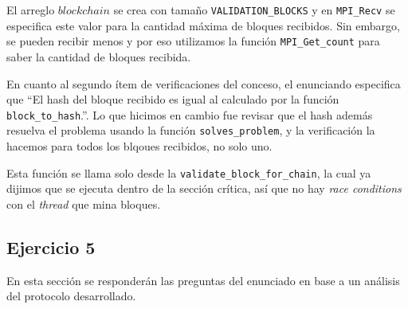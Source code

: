 \documentclass[10pt, a4paper, hidelinks]{article}
\begin{document}
El arreglo $blockchain$ se crea con tamaño \texttt{VALIDATION\_BLOCKS} y en \texttt{MPI\_Recv} se especifica este valor para la cantidad máxima de bloques recibidos. Sin embargo, se pueden recibir menos y por eso utilizamos la función \texttt{MPI\_Get\_count} para saber la cantidad de bloques recibida. 

En cuanto al segundo ítem de verificaciones del conceso, el enunciando especifica que ``El hash del bloque recibido es igual al calculado por la función \texttt{block\_to\_hash}.''. Lo que hicimos en cambio fue revisar que el hash además resuelva el problema usando la función \texttt{solves\_problem}, y la verificación la hacemos para todos los blqoues recibidos, no solo uno.

Esta función se llama solo desde la \texttt{validate\_block\_for\_chain}, la cual ya dijimos que se ejecuta dentro de la sección crítica, así que no hay \textit{race conditions} con el \textit{thread} que mina bloques.

\subsection{Ejercicio 5}
En esta sección se responderán las preguntas del enunciado en base a un análisis del protocolo desarrollado.
\end{document}
